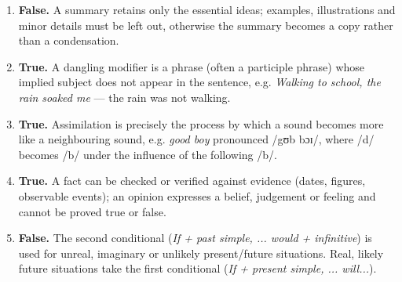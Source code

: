 \documentclass[11pt]{article}
\begin{document}
\begin{corrige}
\begin{enumerate}
\item \textbf{False.} A summary retains only the essential ideas; examples, illustrations and minor details must be left out, otherwise the summary becomes a copy rather than a condensation.
\item \textbf{True.} A dangling modifier is a phrase (often a participle phrase) whose implied subject does not appear in the sentence, e.g. \emph{Walking to school, the rain soaked me} — the rain was not walking.
\item \textbf{True.} Assimilation is precisely the process by which a sound becomes more like a neighbouring sound, e.g. \emph{good boy} pronounced /gʊb bɔɪ/, where /d/ becomes /b/ under the influence of the following /b/.
\item \textbf{True.} A fact can be checked or verified against evidence (dates, figures, observable events); an opinion expresses a belief, judgement or feeling and cannot be proved true or false.
\item \textbf{False.} The second conditional (\emph{If + past simple, ... would + infinitive}) is used for unreal, imaginary or unlikely present/future situations. Real, likely future situations take the first conditional (\emph{If + present simple, ... will...}).
\end{enumerate}
\end{corrige}
\end{document}
